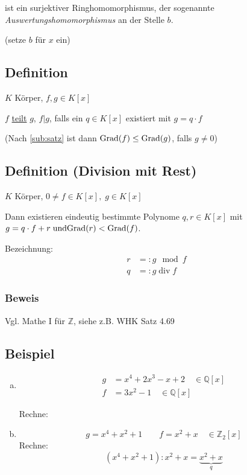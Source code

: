 ist ein surjektiver Ringhomomorphismus, der sogenannte \emph{Auswertungshomomorphismus} an der Stelle $b$.

(setze $b$ für $x$ ein)


\subsection{Definition}

$K$ Körper, $f, g \in K[x]$

$f$ \underline{teilt} $g$, $f|g$, falls ein $q \in K[x]$ existiert mit $g = q \cdot f$

(Nach \ref{sub:satz} ist dann $\mathrm{ Grad }(f) \leq \mathrm{ Grad }(g)$, falls $g \neq 0$)

\subsection{Definition (Division mit Rest)}

$K$ Körper, $0 \neq f \in K[x],\; g \in K[x]$

Dann existieren eindeutig bestimmte Polynome $q, r \in K[x]$ mit
$g = q \cdot f + r \; \text{und} \;\\ \mathrm{ Grad }(r) < \mathrm{ Grad }(f)$.

Bezeichnung:
\begin{align*}
	 r &=: g \mod f\\
	 q &=: g\; \text{div}\;  f
\end{align*}

\subsubsection*{Beweis}
Vgl. Mathe I für $\mathbb{Z}$, siehe z.B. WHK Satz 4.69

\subsection{Beispiel}
\label{sub:2.25}

\begin{enumerate}[a)]
	\item
	\begin{align*}
	g &= x^4+2x^3-x+2 \quad \in \mathbb{Q}[x]\\
	f &= 3x^2-1 \quad \in \mathbb{Q}[x]
	\end{align*}
	
	Rechne:
		
	\item
	\[g = x^4+x^2+1 \quad \quad f=x^2+x \quad \in \mathbb{Z}_2[x]\]
	Rechne:
	\[(x^4+x^2+1) : x^2+x= \underbrace{x^2+x}_{q}\]
	
	
\end{enumerate}


